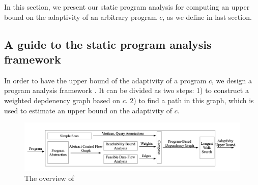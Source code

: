 In this section, we present our static program analysis for computing an upper bound on the adaptivity of an arbitrary program $c$, as we define in last section.
%
\subsection{A guide to the static program analysis framework}
In order to have the upper bound of the  adaptivity of a program $c$, we design a program analysis framework {\THESYSTEM}. It can be divided as two steps: 1) to construct a weighted depdenency graph based on $c$. 2) to find a path in this graph, which is used to estimate an upper bound on the adaptivity of $c$.
\begin{figure}
  \centering    
\includegraphics[width=1.0\columnwidth]{adapfun.png}
  \vspace{-0.3cm}
  \caption{The overview of {\THESYSTEM}}
  \label{fig:adaptfun}
  \vspace{-0.5cm}
\end{figure}
